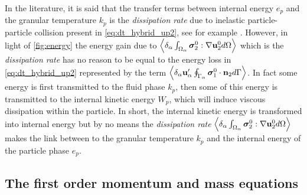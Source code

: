 In the literature, it is said that the transfer terms between internal energy $e_p$ and the granular temperature $k_p$ is the \textit{dissipation rate} due to inelastic particle-particle collision present in \ref{eq:dt_hybrid_up2}, see for example \citet{fox2014multiphase,rao2008introduction}. 
However, in light of \ref{fig:energy} the energy gain due to  $\left<\delta_\alpha \int_{\Omega_\alpha} \bm{\sigma}_2^0:\mathbf{\nabla} \textbf{u}_2^0 d\Omega\right>$ which is the \textit{dissipation rate} has no reason to be equal to the energy loss in \ref{eq:dt_hybrid_up2} represented by the term $\left<\delta_\alpha \textbf{u}_\alpha' \oint_{\Gamma_\alpha} \bm{\sigma}_1^0 \cdot \textbf{n}_2 d\Gamma\right>$. 
In fact some energy is first transmitted to the fluid phase $k_p$, then some of this energy is transmitted to the internal kinetic energy $W_p$, which will induce viscous dissipation within the particle. 
In short, the internal kinetic energy is transformed into internal energy but by no means the \textit{dissipation rate} $\left<\delta_\alpha \int_{\Omega_\alpha} \bm{\sigma}_2^0:\mathbf{\nabla} \textbf{u}_2^0 d\Omega\right>$ makes the link between to the granular temperature $k_p$ and the internal energy of the particle phase $e_p$. 

\subsection{The first order momentum and mass equations}

